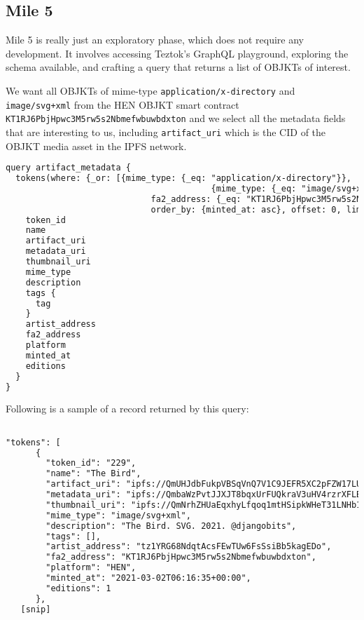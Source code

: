 \subsection {Mile 5}

Mile 5 is really just an exploratory phase, which does not require any development. It involves accessing Teztok's GraphQL playground\footnotemark[7], exploring the schema available, and crafting a query that returns a list of OBJKTs of interest.


We want all OBJKTs of mime-type \texttt{application/x-directory} and \\ \texttt{image/svg+xml} from the HEN OBJKT smart contract \\\texttt{KT1RJ6PbjHpwc3M5rw5s2Nbmefwbuwbdxton} and we select all the metadata fields that are interesting to us, including \texttt{artifact\_uri} which is the CID of the OBJKT media asset in the IPFS network.


\vspace{0.5cm}

\begin{lstlisting}[language=HTML, caption={GraphQL query to retrieve OBJKTs of interest}] 
query artifact_metadata {
  tokens(where: {_or: [{mime_type: {_eq: "application/x-directory"}},
    									 {mime_type: {_eq: "image/svg+xml"}}],
    						 fa2_address: {_eq: "KT1RJ6PbjHpwc3M5rw5s2Nbmefwbuwbdxton"}},
    						 order_by: {minted_at: asc}, offset: 0, limit: 10) {
    token_id
    name
    artifact_uri
    metadata_uri
    thumbnail_uri
    mime_type
    description
    tags {
      tag
    }
    artist_address
    fa2_address
    platform
    minted_at
    editions
  }
}
\end{lstlisting}


Following is a sample of a record returned by this query:


\vspace{0.5cm}

\begin{lstlisting}[language=HTML, caption={Sample OBJKT Record }] 

"tokens": [
      {
        "token_id": "229",
        "name": "The Bird",
        "artifact_uri": "ipfs://QmUHJdbFukpVBSqVnQ7V1C9JEFR5XC2pFZW17LUEpAtQnd",
        "metadata_uri": "ipfs://QmbaWzPvtJJXJT8bqxUrFUQkraV3uHV4rzrXFLBcJ18kH1",
        "thumbnail_uri": "ipfs://QmNrhZHUaEqxhyLfqoq1mtHSipkWHeT31LNHb1QEbDHgnc",
        "mime_type": "image/svg+xml",
        "description": "The Bird. SVG. 2021. @djangobits",
        "tags": [],
        "artist_address": "tz1YRG68NdqtAcsFEwTUw6FsSsiBb5kagEDo",
        "fa2_address": "KT1RJ6PbjHpwc3M5rw5s2Nbmefwbuwbdxton",
        "platform": "HEN",
        "minted_at": "2021-03-02T06:16:35+00:00",
        "editions": 1
      },
   [snip]
\end{lstlisting}




